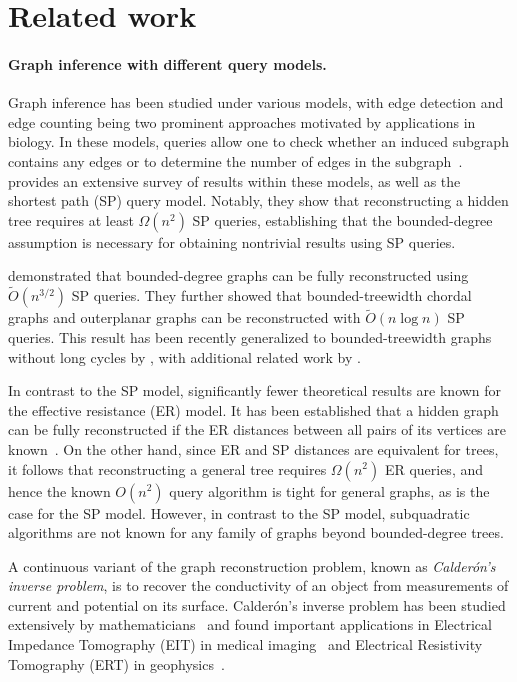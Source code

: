 \section{Related work}
\paragraph{Graph inference with different query models.}
Graph inference has been studied under various models, with {edge detection} and {edge counting} being two prominent approaches motivated by applications in biology. In these models, queries allow one to check whether an induced subgraph contains any edges or to determine the number of edges in the subgraph~\citep{sicomp/AlonBKRS04, journals/jcss/AngluinC08, journals/siamdm/AlonA05, conf/wg/BouvelGK05}.~\citet{alt/ReyzinS07} provides an extensive survey of results within these models, as well as the shortest path (SP) query model. Notably, they show that reconstructing a hidden tree requires at least $\Omega(n^2)$ SP queries, establishing that the bounded-degree assumption is necessary for obtaining nontrivial results using SP queries.

\citet{journals/talg/KannanMZ18}
demonstrated that bounded-degree graphs can be fully reconstructed using $\widetilde{O}(n^{3/2})$ SP queries. They further showed that bounded-treewidth chordal graphs and outerplanar graphs can be reconstructed with $\widetilde{O}(n\log n)$ SP queries. This result has been recently generalized to bounded-treewidth graphs without long cycles by \citet{conf/iwpec/Bestide24}, with additional related work by \citet*{journals/tcs/RongLYW21}.

In contrast to the SP model, significantly fewer theoretical results are known for the {effective resistance (ER) model}. It has been established that a hidden graph can be fully reconstructed if the ER distances between all pairs of its vertices are known~\citep{journals/tcs/WittmannSBT09,Spielman2012TreesRecNotes,Hoskins2018Inferring}. On the other hand, since ER and SP distances are equivalent for trees, it follows that reconstructing a general tree requires $\Omega(n^2)$ ER queries, and hence the known $O(n^2)$ query algorithm is tight for general graphs, as is the case for the SP model. However, in contrast to the SP model, subquadratic algorithms are not known for any family of graphs beyond bounded-degree trees.

A continuous variant of the graph reconstruction problem, known as \emph{Calder\'{o}n's inverse problem}, is to recover the conductivity of an object from measurements of current and potential on its surface.  Calder\'{o}n's inverse problem has been studied extensively by mathematicians~\citep{Uhlmann2012} and found important applications in Electrical Impedance Tomography (EIT) in medical imaging~\citep{uhlmann2009electrical} and Electrical Resistivity Tomography (ERT) in geophysics~\citep{wikipediaERT}.

